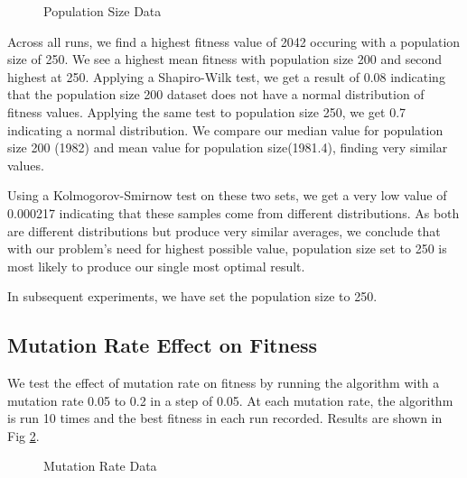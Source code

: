 \documentclass[11pt,a4paper]{article}
\begin{document}
\begin{figure}
\centering
{}
\qquad
{}
\caption{Population Size Data}
\label{fig:popSizeFit}
\end{figure}
Across all runs, we find a highest fitness value of 2042 occuring with a population size of 250. We see a highest mean fitness with population size 200 and second highest at 250. Applying a Shapiro-Wilk test, we get a result of 0.08 indicating that the population size 200 dataset does not have a normal distribution of fitness values. Applying the same test to population size 250, we get 0.7 indicating a normal distribution. We compare our median value for population size 200 (1982) and mean value for population size(1981.4), finding very similar values. 

Using a Kolmogorov-Smirnow test on these two sets, we get a very low value of 0.000217 indicating that these samples come from different distributions. As both are different distributions but produce very similar averages, we conclude that with our problem's need for highest possible value, population size set to 250 is most likely to produce our single most optimal result.

In subsequent experiments, we have set the population size to 250.

\subsection{Mutation Rate Effect on Fitness}
We test the effect of mutation rate on fitness by running the algorithm with a mutation rate 0.05 to 0.2 in a step of 0.05. At each mutation rate, the algorithm is run 10 times and the best fitness in each run recorded. Results are shown in Fig \ref{fig:mutRateFit}.

\begin{figure}
\centering
{}
\qquad
{}
\caption{Mutation Rate Data}
\label{fig:mutRateFit}
\end{figure}
\end{document}
